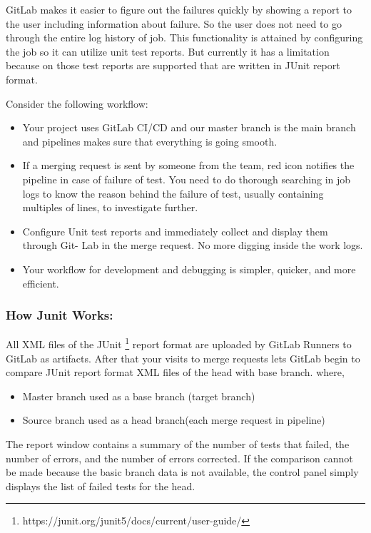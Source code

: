 GitLab makes it easier to figure out the failures quickly by showing a report to the user including information about failure. So the user does not need to go through the entire log history of job. This functionality is attained by configuring the job so it can utilize unit test reports. But currently it has a limitation because on those test reports are supported
that are written in JUnit report format. \par

Consider the following workflow:


\begin{itemize}
\item Your project uses GitLab CI/CD and our master branch is the main branch and
pipelines makes sure that everything is going smooth.
\item If a merging request is sent by someone from the team, red icon notifies the pipeline
in case of failure of test. You need to do thorough searching in job logs to know the
reason behind the failure of test, usually containing multiples of lines, to investigate
further.
\item Configure Unit test reports and immediately collect and display them through Git-
Lab in the merge request. No more digging inside the work logs.
\item Your workflow for development and debugging is simpler, quicker, and more efficient. 
\end{itemize}

\subsubsection{How Junit Works:}

All XML files of the JUnit \footnote{https://junit.org/junit5/docs/current/user-guide/} report format are uploaded by GitLab Runners to GitLab as artifacts. After that your visits to merge requests lets GitLab begin to compare JUnit report format XML files of the head with base branch. where,

\begin{itemize}
\item Master branch used as a base branch (target branch) 
\item Source branch used as a head branch(each merge request in pipeline)
\end{itemize}

The report window contains a summary of the number of tests that failed, the number
of errors, and the number of errors corrected. If the comparison cannot be made because
the basic branch data is not available, the control panel simply displays the list of failed
tests for the head.


